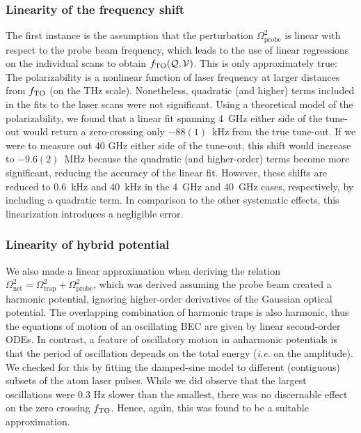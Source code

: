 \subsubsection{Linearity of the frequency shift}
	The first instance is the assumption that the perturbation $\Omega_\mathrm{probe}^2$ is linear with respect to the probe beam frequency, which leads to the use of linear regressions on the individual scans to obtain \(f_{\mathrm{TO}}(\mathcal{Q,V})\).
	This is only approximately true: The polarizability is a nonlinear function of laser frequency at larger distances from $f_\mathrm{TO}$ (on the THz scale). 
	Nonetheless, quadratic (and higher) terms included in the fits to the laser scans were not significant.
	Using a theoretical model of the polarizability, we found that a linear fit spanning 4~GHz either side of the tune-out would return a zero-crossing only $-88(1)$~kHz from the true tune-out. 
	If we were to measure out 40 GHz either side of the tune-out, this shift would increase to $-9.6(2)$~MHz because the quadratic (and higher-order) terms become more significant, reducing the accuracy of the linear fit.
	However, these shifts are reduced to 0.6~kHz and 40~kHz in the 4~GHz and 40~GHz cases, respectively, by including a quadratic term.
	In comparison to the other systematic effects, this linearization introduces a negligible error.

\subsubsection{Linearity of hybrid potential}
	We also made a linear approximation when deriving the relation $\Omega_{\text{net}}^2=\Omega_{\text{trap}}^2+\Omega_{\text{probe}}^2$, which was derived assuming the probe beam created a harmonic potential, ignoring higher-order derivatives of the Gaussian optical potential.
	The overlapping combination of harmonic traps is also harmonic, thus the equations of motion of an oscillating BEC are given by linear second-order ODEs.
	In contrast, a feature of oscillatory motion in anharmonic potentials is that the period of oscillation depends on the total energy (\emph{i.e.} on the amplitude).
	We checked for this by fitting the damped-sine model to different (contiguous) subsets of the atom laser pulses.
	While we did observe that the largest oscillations were 0.3 Hz slower than the smallest, there was no discernable effect on the zero crossing $f_\mathrm{TO}$.  
	Hence, again, this was found to be a suitable approximation.


